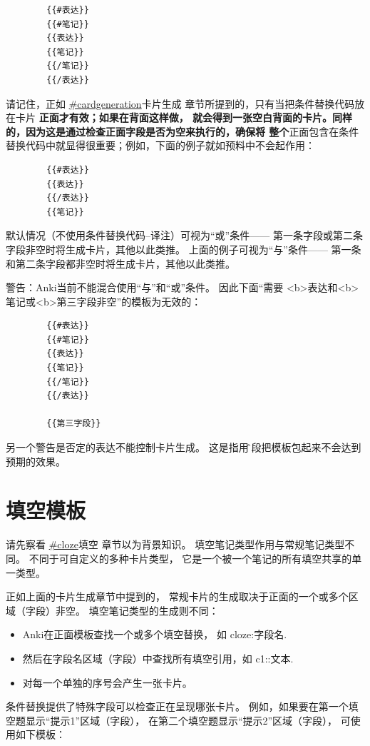 \documentclass[a4paper]{book}
\begin{document}
	\begin{shaded}\begin{verbatim}
		{{#表达}}
		{{#笔记}}
		{{表达}}
		{{笔记}}
		{{/笔记}}
		{{/表达}}
		\end{verbatim}\end{shaded}
	请记住，正如 \url{#cardgeneration}卡片生成 章节所提到的，只有当把条件替换代码放在卡片
	\textbf{正面才有效；如果在背面这样做， 就会得到一张空白背面的卡片。同样的，因为这是通过检查正面字段是否为空来执行的，确保将 整个}正面包含在条件替换代码中就显得很重要；例如，下面的例子就如预料中不会起作用：
	\begin{shaded}\begin{verbatim}
		{{#表达}}
		{{表达}}
		{{/表达}}
		{{笔记}}
		\end{verbatim}\end{shaded}
	默认情况（不使用条件替换代码--译注）可视为“或”条件—— 第一条字段或第二条字段非空时将生成卡片，其他以此类推。 上面的例子可视为“与”条件—— 第一条和第二条字段都非空时将生成卡片，其他以此类推。
	
	警告：Anki当前不能混合使用“与”和“或”条件。 因此下面“需要
	<b>表达和<b>笔记或<b>第三字段非空”的模板为无效的：
	\begin{shaded}\begin{verbatim}
		{{#表达}}
		{{#笔记}}
		{{表达}}
		{{笔记}}
		{{/笔记}}
		{{/表达}}
		
		{{第三字段}}
		\end{verbatim}\end{shaded}
	另一个警告是否定的表达不能控制卡片生成。 这是指用{{\^字段}}把模板包起来不会达到预期的效果。
	
	\section{填空模板}
	请先察看 \url{#cloze}填空 章节以为背景知识。
	填空笔记类型作用与常规笔记类型不同。 不同于可自定义的多种卡片类型， 它是一个被一个笔记的所有填空共享的单一类型。
	
	正如上面的卡片生成章节中提到的， 常规卡片的生成取决于正面的一个或多个区域（字段）非空。 填空笔记类型的生成则不同：
	
	\begin{itemize}
		\itemsep1pt\parskip0pt
		\item Anki在正面模板查找一个或多个填空替换， 如 {{cloze:字段名}}.
		\item 然后在字段名区域（字段）中查找所有填空引用，如 {{c1::文本}}.
		\item 对每一个单独的序号会产生一张卡片。
	\end{itemize}
	条件替换提供了特殊字段可以检查正在呈现哪张卡片。 例如，如果要在第一个填空题显示“提示1”区域（字段）， 在第二个填空题显示“提示2”区域（字段）， 可使用如下模板：
	
\end{document}
